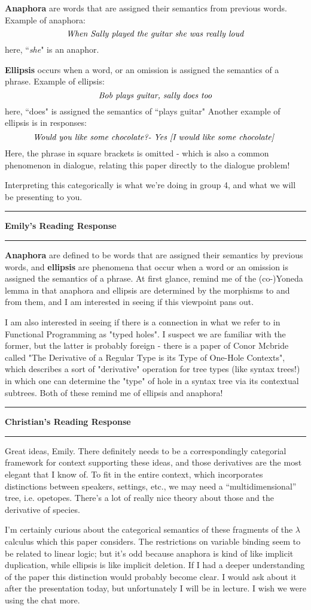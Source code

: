 \documentclass{amsart}
\newcommand{\iam}[1]{
  \vspace{0.25em}
  \hrule
  \vspace{0.25em}
  \textbf{{#1}'s Reading Response}
  \vspace{0.25em}
  \hrule
  \vspace{1em}
}
\begin{document}
\textbf{Anaphora} are words that are assigned their semantics from previous words. Example of anaphora:
  $$\textrm{\emph{When Sally played the guitar she was really loud}}$$
here, ``\emph{she}" is an anaphor.

\textbf{Ellipsis} occurs when a word, or an omission is assigned the semantics of a phrase. Example of ellipsis:
  $$\textrm{\emph{Bob plays guitar, sally does too}}$$
  here, ``does" is assigned the semantics of ``plays guitar"
  Another example of ellipsis is in responses:
  $$\textrm{\emph{Would you like some chocolate?\\
  - Yes [I would like some chocolate] }}$$
  Here, the phrase in square brackets is omitted - which is also a common phenomenon in dialogue, relating this paper directly to the dialogue problem!

Interpreting this categorically is what we’re doing in group 4, and what we will be presenting to you.

\iam{Emily}

\textbf{Anaphora} are defined to be words that are assigned their semantics by previous words, and \textbf{ellipsis} are phenomena that occur when a word or an omission is assigned the semantics of a phrase. At first glance, remind me of the (co-)Yoneda lemma in that anaphora and ellipsis are determined by the morphisms to and from them, and I am interested in seeing if this viewpoint pans out.

I am also interested in seeing if there is a connection in what we refer to in Functional Programming as "typed holes". I suspect we are familiar with the former, but the latter is probably foreign - there is a paper of Conor Mcbride called "The Derivative of a Regular Type is its Type of One-Hole Contexts", which describes a sort of "derivative" operation for tree types (like syntax trees!) in which one can determine the "type" of hole in a syntax tree via its contextual subtrees. Both of these remind me of ellipsis and anaphora!

\iam{Christian}

Great ideas, Emily. There definitely needs to be a correspondingly categorial framework for context supporting these ideas, and those derivatives are the most elegant that I know of. To fit in the entire context, which incorporates distinctions between speakers, settings, etc., we may need a ``multidimensional'' tree, i.e. opetopes. There's a lot of really nice theory about those and the derivative of species.

I'm certainly curious about the categorical semantics of these fragments of the $\lambda$ calculus which this paper considers. The restrictions on variable binding seem to be related to linear logic; but it's odd because anaphora is kind of like implicit duplication, while ellipsis is like implicit deletion. If I had a deeper understanding of the paper this distinction would probably become clear. I would ask about it after the presentation today, but unfortunately I will be in lecture. I wish we were using the chat more.
\end{document}
